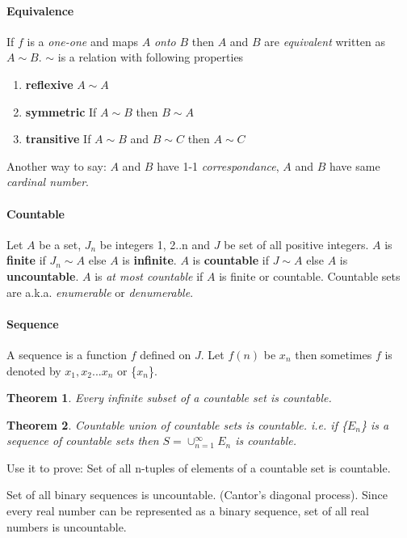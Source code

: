 \documentclass{article}
\newtheorem{theorem}{Theorem}
\begin{document}
	\paragraph{Equivalence} If $f$ is a \textit{one-one} and maps $A$ \textit{onto} $B$ then $A$ and $B$ are \textit{equivalent} written as $A \sim B$. $\sim$ is a relation with following properties
	\begin{enumerate}
		\item \textbf{reflexive} $A \sim A$
		\item \textbf{symmetric} If $A \sim B$ then $B \sim A$
		\item \textbf{transitive} If $A \sim B$ and $B \sim C$ then $A \sim C$
	\end{enumerate}
	Another way to say: $A$ and $B$ have 1-1 \textit{correspondance}, $A$ and $B$ have same \textit{cardinal number}.
	
	\paragraph{Countable} Let $A$ be a set, $J_n$ be integers 1, 2..n and $J$ be set of all positive integers. $A$ is \textbf{finite} if $J_n \sim A$ else $A$ is \textbf{infinite}. $A$ is \textbf{countable} if $J \sim A$ else $A$ is \textbf{uncountable}. $A$ is \textit{at most countable} if $A$ is finite or countable. Countable sets are a.k.a. \textit{enumerable} or \textit{denumerable}.
	
	\paragraph{Sequence} A sequence is a function $f$ defined on $J$. Let $f(n)$ be $x_n$ then sometimes $f$ is denoted by $x_1, x_2...x_n$ or \{$x_n$\}.
	
	\begin{theorem}
		Every infinite subset of a countable set is countable.
	\end{theorem}
	\begin{theorem}
		Countable union of countable sets is countable. i.e. if \{$E_n$\} is a sequence of countable sets then $S = \cup^{\infty}_{n=1} E_n$ is countable. 
	\end{theorem}
	Use it to prove: Set of all n-tuples of elements of a countable set is countable. 
	
	Set of all binary sequences is uncountable. (Cantor's diagonal process). Since every real number can be represented as a binary sequence, set of all real numbers is uncountable.
\end{document}
